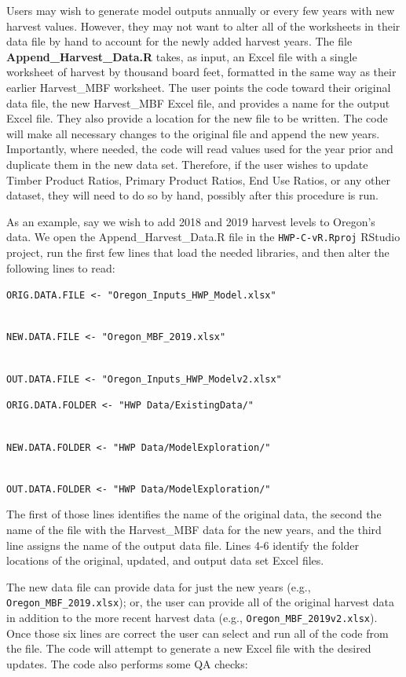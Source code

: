 \documentclass[
  openany]{book}
\begin{document}
Users may wish to generate model outputs annually or every few years with new harvest values. However, they may not want to alter all of the worksheets in their data file by hand to account for the newly added harvest years. The file \textbf{Append\_Harvest\_Data.R} takes, as input, an Excel file with a single worksheet of harvest by thousand board feet, formatted in the same way as their earlier Harvest\_MBF worksheet. The user points the code toward their original data file, the new Harvest\_MBF Excel file, and provides a name for the output Excel file. They also provide a location for the new file to be written. The code will make all necessary changes to the original file and append the new years. Importantly, where needed, the code will read values used for the year prior and duplicate them in the new data set. Therefore, if the user wishes to update Timber Product Ratios, Primary Product Ratios, End Use Ratios, or any other dataset, they will need to do so by hand, possibly after this procedure is run.

As an example, say we wish to add 2018 and 2019 harvest levels to Oregon's data. We open the Append\_Harvest\_Data.R file in the \texttt{HWP-C-vR.Rproj} RStudio project, run the first few lines that load the needed libraries, and then alter the following lines to read:

\texttt{ORIG.DATA.FILE\ \textless{}-\ "Oregon\_Inputs\_HWP\_Model.xlsx"}\strut \\
\texttt{NEW.DATA.FILE\ \textless{}-\ "Oregon\_MBF\_2019.xlsx"}\strut \\
\texttt{OUT.DATA.FILE\ \textless{}-\ "Oregon\_Inputs\_HWP\_Modelv2.xlsx"}

\texttt{ORIG.DATA.FOLDER\ \textless{}-\ "HWP\ Data/ExistingData/"}\strut \\
\texttt{NEW.DATA.FOLDER\ \textless{}-\ "HWP\ Data/ModelExploration/"}\strut \\
\texttt{OUT.DATA.FOLDER\ \textless{}-\ "HWP\ Data/ModelExploration/"}

The first of those lines identifies the name of the original data, the second the name of the file with the Harvest\_MBF data for the new years, and the third line assigns the name of the output data file. Lines 4-6 identify the folder locations of the original, updated, and output data set Excel files.

The new data file can provide data for just the new years (e.g., \texttt{Oregon\_MBF\_2019.xlsx}); or, the user can provide all of the original harvest data in addition to the more recent harvest data (e.g., \texttt{Oregon\_MBF\_2019v2.xlsx}). Once those six lines are correct the user can select and run all of the code from the file. The code will attempt to generate a new Excel file with the desired updates. The code also performs some QA checks:
\end{document}
